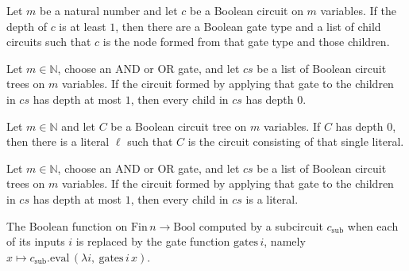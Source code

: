 \begin{lemma}
\label{LMN.TreeCircuit.exists_node_of_depth_ge_one}
\leanok
{}
Let $m$ be a natural number and let $c$ be a Boolean circuit on $m$ variables. If the
depth of $c$ is at least $1$, then there are a Boolean gate type and a list of child
circuits such that $c$ is the node formed from that gate type and those children.
\end{lemma}

\begin{lemma}
\label{LMN.TreeCircuit.depth1_children_are_lits}
\leanok
{}
Let $m\in\mathbb N$, choose an AND or OR gate, and let $cs$ be a list of Boolean circuit
trees on $m$ variables. If the circuit formed by applying that gate to the children in
$cs$ has depth at most $1$, then every child in $cs$ has depth $0$.
\end{lemma}

\begin{lemma}
\label{LMN.TreeCircuit.depth0_is_lit}
\leanok
{}
Let $m\in\mathbb N$ and let $C$ be a Boolean circuit tree on $m$ variables. If $C$ has
depth $0$, then there is a literal $\ell$ such that $C$ is the circuit consisting of
that single literal.
\end{lemma}

\begin{lemma}
\label{LMN.TreeCircuit.depth1_all_lits}
\leanok
{}
Let $m\in\mathbb N$, choose an AND or OR gate, and let $cs$ be a list of Boolean circuit
trees on $m$ variables. If the circuit formed by applying that gate to the children in
$cs$ has depth at most $1$, then every child in $cs$ is a literal.
\end{lemma}

\begin{definition}
\label{LMN.childFunction}
\leanok
{}
The Boolean function on $\mathrm{Fin}\,n \to \mathrm{Bool}$ computed by a subcircuit
$c_{\mathrm{sub}}$ when each of its inputs $i$ is replaced by the gate function
$\mathrm{gates}\,i$, namely $x \mapsto c_{\mathrm{sub}}.\mathrm{eval}\,(\lambda i,\ \mathrm{gates}\,i\,x)$.
\end{definition}

